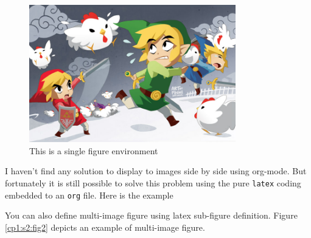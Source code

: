 \documentclass[12pt]{report}
\numberwithin{equation}{section}
\theoremstyle{definition}
\theoremstyle{remark}
\theoremstyle{example}
\theoremstyle{axiom}
\begin{document}
\begin{figure}[!ht]
\centering
\includegraphics[width=0.8\textwidth]{./figures/Sample/tumblr_static_eaceks0rfxsss8o4swscw40wo.jpg}
\caption{\label{cp1:s2:fig1}This is a single figure environment}
\end{figure}


I haven't find any solution to display to images side by side using org-mode.
But fortunately it is still possible to solve this problem using the pure \texttt{latex}
coding embedded to an \texttt{org} file. Here is the example

You can also define multi-image figure using latex sub-figure definition.
Figure \ref{cp1:s2:fig2} depicts an example of multi-image figure.
\end{document}

